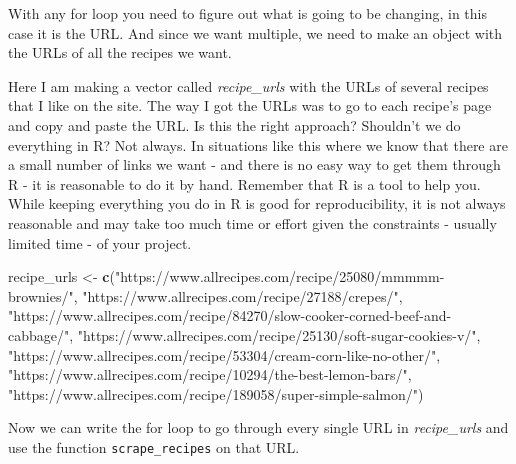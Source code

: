 \documentclass[
  12pt,
]{book}
\newenvironment{Shaded}{\begin{snugshade}}{\end{snugshade}}
\newcommand{\KeywordTok}[1]{\textcolor[rgb]{0.27,0.27,0.27}{\textbf{#1}}}
\newcommand{\NormalTok}[1]{#1}
\newcommand{\StringTok}[1]{\textcolor[rgb]{0.5,0.5,0.5}{#1}}
\begin{document}
With any for loop you need to figure out what is going to be changing, in this case it is the URL. And since we want multiple, we need to make an object with the URLs of all the recipes we want.

Here I am making a vector called \emph{recipe\_urls} with the URLs of several recipes that I like on the site. The way I got the URLs was to go to each recipe's page and copy and paste the URL. Is this the right approach? Shouldn't we do everything in R? Not always. In situations like this where we know that there are a small number of links we want - and there is no easy way to get them through R - it is reasonable to do it by hand. Remember that R is a tool to help you. While keeping everything you do in R is good for reproducibility, it is not always reasonable and may take too much time or effort given the constraints - usually limited time - of your project.

\begin{Shaded}
\begin{Highlighting}[]
\NormalTok{recipe\_urls <{-}}\StringTok{ }\KeywordTok{c}\NormalTok{(}\StringTok{"https://www.allrecipes.com/recipe/25080/mmmmm{-}brownies/"}\NormalTok{,}
                 \StringTok{"https://www.allrecipes.com/recipe/27188/crepes/"}\NormalTok{,}
                 \StringTok{"https://www.allrecipes.com/recipe/84270/slow{-}cooker{-}corned{-}beef{-}and{-}cabbage/"}\NormalTok{,}
                 \StringTok{"https://www.allrecipes.com/recipe/25130/soft{-}sugar{-}cookies{-}v/"}\NormalTok{,}
                 \StringTok{"https://www.allrecipes.com/recipe/53304/cream{-}corn{-}like{-}no{-}other/"}\NormalTok{,}
                 \StringTok{"https://www.allrecipes.com/recipe/10294/the{-}best{-}lemon{-}bars/"}\NormalTok{,}
                 \StringTok{"https://www.allrecipes.com/recipe/189058/super{-}simple{-}salmon/"}\NormalTok{)}
\end{Highlighting}
\end{Shaded}

Now we can write the for loop to go through every single URL in \emph{recipe\_urls} and use the function \texttt{scrape\_recipes} on that URL.
\end{document}
